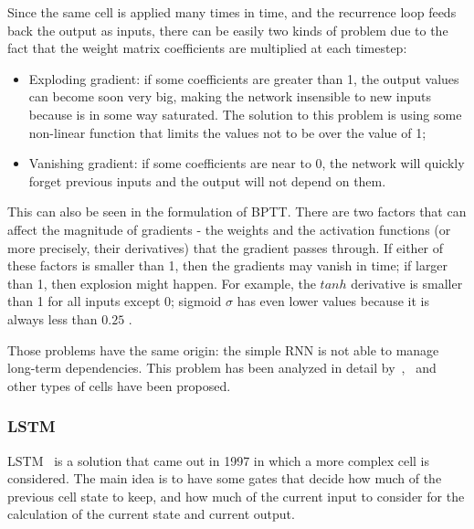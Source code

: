 Since the same cell is applied many times in time, and the recurrence loop feeds back the output as inputs, there can be easily two kinds of problem due to the fact that the weight matrix coefficients are multiplied at each timestep:

\begin{itemize}
	\item Exploding gradient: if some coefficients are greater than 1, the output values can become soon very big, making the network insensible to new inputs because is in some way saturated. The solution to this problem is using some non-linear function that limits the values not to be over the value of 1;

	\item Vanishing gradient: if some coefficients are near to 0, the network will quickly forget previous inputs and the output will not depend on them.
\end{itemize}

This can also be seen in the formulation of BPTT. There are two factors that can affect the magnitude of gradients - the weights and the activation functions (or more precisely, their derivatives) that the gradient passes through. If either of these factors is smaller than 1, then the gradients may vanish in time; if larger than 1, then explosion might happen. For example, the  \( tanh \)  derivative is smaller than 1 for all inputs except 0; sigmoid  \(  \sigma  \)  has even lower values because it is always less than  \( 0.25 \) .

Those problems have the same origin: the simple RNN is not able to manage long-term dependencies. This problem has been analyzed in detail by~\cite{bengio1994learning},~\cite{hochreiter1998vanishing} and other types of cells have been proposed.

\subsubsection{LSTM}
LSTM~\cite{hochreiter1997long} is a solution that came out in 1997 in which a more complex cell is considered. The main idea is to have some gates that decide how much of the previous cell state to keep, and how much of the current input to consider for the calculation of the current state and current output.


